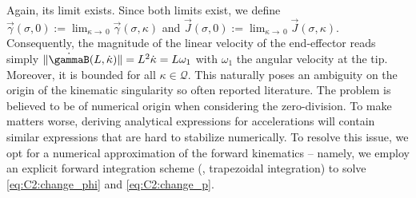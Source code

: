 \begin{rmk}
 Again, its limit exists. Since both limits exist, we define $\vec{\gamma}(\sigma,0):= \lim_{\kappa \to \,0} \vec{\gamma}(\sigma,\kappa)$ and $\vec{J}(\sigma,0):= \lim_{\kappa \to \,0} \vec{J}(\sigma,\kappa)$. Consequently, the magnitude of the linear velocity of the end-effector reads simply $\lVert \dot{\gammaB}(L,\dot{\kappa}) \rVert = L^2\dot{\kappa} = L \omega_1$ with $\omega_1$ the angular velocity at the tip. Moreover, it is bounded for all $\kappa \in \mathcal{Q}$. This naturally poses an ambiguity on the origin of the kinematic singularity so often reported literature. The problem is believed to be of numerical origin when considering the zero-division. To make matters worse, deriving analytical expressions for accelerations will contain similar expressions that are hard to stabilize numerically. To resolve this issue, we opt for a numerical approximation of the forward kinematics -- namely, we employ an explicit forward integration scheme (\ie, trapezoidal integration) to solve \eqref{eq:C2:change_phi} and \eqref{eq:C2:change_p}.
\end{rmk}

